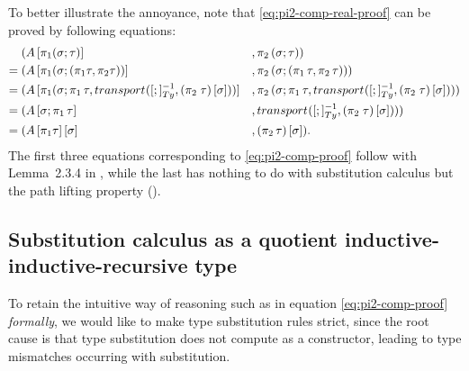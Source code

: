 \documentclass[a4paper,UKenglish,numberwithinsect,cleveref,thm-restate]{lipics-v2021}
\begin{document}
\begin{example}
  To better illustrate the annoyance, note that \eqref{eq:pi2-comp-real-proof} can be proved by following equations:
  \begin{alignat*}{3}
         & (\sub{A}{\pi_1(\sigma; \tau)}                    &&, \pi_2\,(\sigma ; \tau)) \\
    = {} & (\sub{A}{\pi_1(\sigma; (\pi_1\tau , \pi_2\tau))} &&, \pi_2\,(\sigma; (\pi_1\,\tau, \pi_2\,\tau))) \\
    = {} & (\sub{A}{\pi_1(\sigma;\pi_1\,\tau, \transfib{}{[;]_{\Ty}^{-1}}{\color{black}\sub{(\pi_2\;\tau)}{\sigma}})} &&, \pi_2\,(\sigma;\pi_1\,\tau, \transfib{}{[;]_{\Ty}^{-1}}{\color{black}\sub{(\pi_2\;\tau)}{\sigma}})) \\
    = {} & (\sub{A}{\sigma;\pi_1\,\tau} &&, \transfib{}{[;]_{\Ty}^{-1}}{\color{black}\sub{(\pi_2\;\tau)}{\sigma}})) \nonumber \\
    = {} & (\sub{\sub{A}{\pi_1\tau}}{\sigma} &&, \sub{(\pi_2\,\tau)}{\sigma}). \nonumber
  \end{alignat*}
  The first three equations corresponding to \eqref{eq:pi2-comp-proof} follow with Lemma~2.3.4 in \cite{UFP2013}, while the last has nothing to do with substitution calculus but the path lifting property (\cite[Lemma~2.3.2]{UFP2013}).
\end{example}

\subsection{Substitution calculus as a quotient inductive-inductive-recursive type} \label{subsec:SC-QIIRT}

To retain the intuitive way of reasoning such as in equation \eqref{eq:pi2-comp-proof} \emph{formally}, we would like to make type substitution rules strict, since the root cause is that type substitution does not compute as a constructor, leading to type mismatches occurring with substitution.
\end{document}
